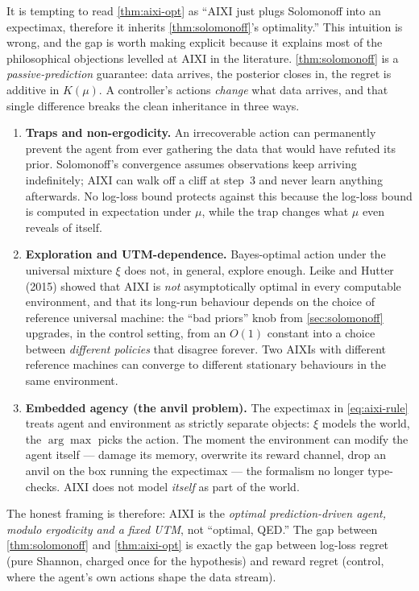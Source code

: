 \documentclass[12pt,a4paper]{article}
\theoremstyle{plain}
\theoremstyle{definition}
\begin{document}
It is tempting to read \cref{thm:aixi-opt} as ``AIXI just plugs
Solomonoff into an expectimax, therefore it inherits
\cref{thm:solomonoff}'s optimality.''  This intuition is wrong, and
the gap is worth making explicit because it explains most of the
philosophical objections levelled at AIXI in the literature.
\cref{thm:solomonoff} is a \emph{passive-prediction} guarantee: data
arrives, the posterior closes in, the regret is additive in
$K(\mu)$.  A controller's actions \emph{change} what data arrives,
and that single difference breaks the clean inheritance in three
ways.
\begin{enumerate}
  \item \textbf{Traps and non-ergodicity.}  An irrecoverable action
    can permanently prevent the agent from ever gathering the data
    that would have refuted its prior.  Solomonoff's convergence
    assumes observations keep arriving indefinitely; AIXI can walk
    off a cliff at step~$3$ and never learn anything afterwards.
    No log-loss bound protects against this because the log-loss
    bound is computed in expectation under $\mu$, while the trap
    changes what $\mu$ even reveals of itself.
  \item \textbf{Exploration and UTM-dependence.}  Bayes-optimal
    action under the universal mixture $\xi$ does not, in general,
    explore enough.  Leike and Hutter (2015) showed that AIXI is
    \emph{not} asymptotically optimal in every computable
    environment, and that its long-run behaviour depends on the
    choice of reference universal machine: the ``bad priors'' knob
    from \cref{sec:solomonoff} upgrades, in the control setting,
    from an $O(1)$ constant into a choice between \emph{different
    policies} that disagree forever.  Two AIXIs with different
    reference machines can converge to different stationary
    behaviours in the same environment.
  \item \textbf{Embedded agency (the anvil problem).}  The
    expectimax in \eqref{eq:aixi-rule} treats agent and environment
    as strictly separate objects: $\xi$ models the world, the
    $\arg\max$ picks the action.  The moment the environment can
    modify the agent itself --- damage its memory, overwrite its
    reward channel, drop an anvil on the box running the
    expectimax --- the formalism no longer type-checks.  AIXI
    does not model \emph{itself} as part of the world.
\end{enumerate}
The honest framing is therefore: AIXI is the \emph{optimal
prediction-driven agent, modulo ergodicity and a fixed UTM}, not
``optimal, QED.''  The gap between \cref{thm:solomonoff} and
\cref{thm:aixi-opt} is exactly the gap between log-loss regret
(pure Shannon, charged once for the hypothesis) and reward regret
(control, where the agent's own actions shape the data stream).
\end{document}
